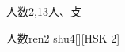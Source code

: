 \begin{entry}{人数}{2,13}{⼈、⽁}
  \begin{phonetics}{人数}{ren2 shu4}[][HSK 2]
  \end{phonetics}
\end{entry}
